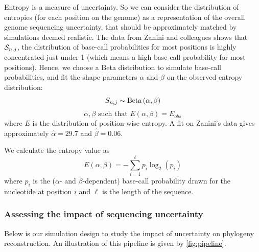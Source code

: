 \documentclass[10pt]{article}
\begin{document}
Entropy is a measure of uncertainty. So we can consider the distribution of entropies (for each position on the genome) as a representation of the overall genome sequencing uncertainty, that should be approximately matched by simulations deemed realistic. 
The data from Zanini and colleagues \cite{Zanini:2015} shows that $\mathcal{S}_{n,j}$, the distribution of base-call probabilities for most positions is highly concentrated just under 1 (which means a high base-call probability for most positions). 
Hence, we choose a Beta distribution to simulate base-call probabilities, and fit the shape parameters $\alpha$ and $\beta$ on the observed entropy distribution:
\begin{equation}
\label{eq:beta_sampling}
S_{n,j} \sim \mathrm{Beta}\left(\alpha, \beta\right)
\end{equation}
\begin{equation}
\alpha, \beta \text{ such that } E(\alpha,\beta) = E_{obs}
\end{equation}
where $E$ is the distribution of position-wise entropy.
A fit on Zanini's data \cite{Zanini:2015} gives approximately $\hat{\alpha} = 29.7$ and $\hat{\beta} = 0.06$. 

We calculate the entropy value as 
\begin{equation}
\label{eq:entropyDefinition}
E(\alpha, \beta) = -\sum_{i=1}^{\ell} p_i \log_2(p_i)
\end{equation}
where $p_i$ is the ($\alpha$- and $\beta$-dependent) base-call probability drawn for the nucleotide at position $i$ and $\ell$ is the length of the sequence.




\subsubsection{Assessing the impact of sequencing uncertainty}


Below is our simulation design to study the impact of uncertainty on phylogeny reconstruction.
An illustration of this pipeline is given by \autoref{fig:pipeline}.
\end{document}

